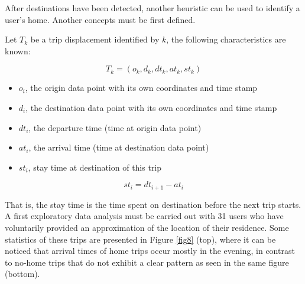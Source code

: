 \documentclass[]{elsarticle} %
\begin{document}
After destinations have been detected, another heuristic can be used to
identify a user's home. Another concepts must be first defined.

Let \(T_k\) be a trip displacement identified by \(k\), the following
characteristics are known:

\[T_k=(o_k, d_k, dt_k, at_k, st_k)\]

\begin{itemize}
\item
  \emph{\(o_i\)}, the origin data point with its own coordinates and
  time stamp
\item
  \emph{\(d_i\)}, the destination data point with its own coordinates
  and time stamp
\item
  \emph{\(dt_i\)}, the departure time (time at origin data point)
\item
  \emph{\(at_i\)}, the arrival time (time at destination data point)
\item
  \emph{\(st_i\)}, stay time at destination of this trip
\end{itemize}

\[ st_i =  dt_{i+1} - at_i\]

That is, the stay time is the time spent on destination before the next
trip starts. A first exploratory data analysis must be carried out with
31 users who have voluntarily provided an approximation of the location
of their residence. Some statistics of these trips are presented in
Figure \ref{fig8} (top), where it can be noticed that arrival times of
home trips occur mostly in the evening, in contrast to no-home trips
that do not exhibit a clear pattern as seen in the same figure (bottom).
\end{document}
